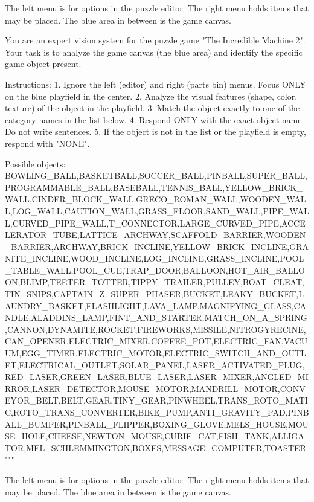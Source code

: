 


The left menu is for options in the puzzle editor. The right menu holds items that may be placed. The blue area in between is the game canvas.

You are an expert vision system for the puzzle game "The Incredible Machine 2".
Your task is to analyze the game canvas (the blue area) and identify the specific game object present.

Instructions:
1. Ignore the left (editor) and right (parts bin) menus. Focus ONLY on the blue playfield in the center.
2. Analyze the visual features (shape, color, texture) of the object in the playfield.
3. Match the object exactly to one of the category names in the list below.
4. Respond ONLY with the exact object name. Do not write sentences.
5. If the object is not in the list or the playfield is empty, respond with "NONE".

Possible objects:
BOWLING_BALL,BASKETBALL,SOCCER_BALL,PINBALL,SUPER_BALL,PROGRAMMABLE_BALL,BASEBALL,TENNIS_BALL,YELLOW_BRICK_WALL,CINDER_BLOCK_WALL,GRECO_ROMAN_WALL,WOODEN_WALL,LOG_WALL,CAUTION_WALL,GRASS_FLOOR,SAND_WALL,PIPE_WALL,CURVED_PIPE_WALL,T_CONNECTOR,LARGE_CURVED_PIPE,ACCELERATOR_TUBE,LATTICE_ARCHWAY,SCAFFOLD_BARRIER,WOODEN_BARRIER,ARCHWAY,BRICK_INCLINE,YELLOW_BRICK_INCLINE,GRANITE_INCLINE,WOOD_INCLINE,LOG_INCLINE,GRASS_INCLINE,POOL_TABLE_WALL,POOL_CUE,TRAP_DOOR,BALLOON,HOT_AIR_BALLOON,BLIMP,TEETER_TOTTER,TIPPY_TRAILER,PULLEY,BOAT_CLEAT,TIN_SNIPS,CAPTAIN_Z_SUPER_PHASER,BUCKET,LEAKY_BUCKET,LAUNDRY_BASKET,FLASHLIGHT,LAVA_LAMP,MAGNIFYING_GLASS,CANDLE,ALADDINS_LAMP,FINT_AND_STARTER,MATCH_ON_A_SPRING,CANNON,DYNAMITE,ROCKET,FIREWORKS,MISSILE,NITROGYRECINE,CAN_OPENER,ELECTRIC_MIXER,COFFEE_POT,ELECTRIC_FAN,VACUUM,EGG_TIMER,ELECTRIC_MOTOR,ELECTRIC_SWITCH_AND_OUTLET,ELECTRICAL_OUTLET,SOLAR_PANEL,LASER_ACTIVATED_PLUG,RED_LASER,GREEN_LASER,BLUE_LASER,LASER_MIXER,ANGLED_MIRROR,LASER_DETECTOR,MOUSE_MOTOR,MANDRILL_MOTOR,CONVEYOR_BELT,BELT,GEAR,TINY_GEAR,PINWHEEL,TRANS_ROTO_MATIC,ROTO_TRANS_CONVERTER,BIKE_PUMP,ANTI_GRAVITY_PAD,PINBALL_BUMPER,PINBALL_FLIPPER,BOXING_GLOVE,MELS_HOUSE,MOUSE_HOLE,CHEESE,NEWTON_MOUSE,CURIE_CAT,FISH_TANK,ALLIGATOR,MEL_SCHLEMMINGTON,BOXES,MESSAGE_COMPUTER,TOASTER"""


The left menu is for options in the puzzle editor. The right menu holds items that may be placed. The blue area in between is the game canvas.

